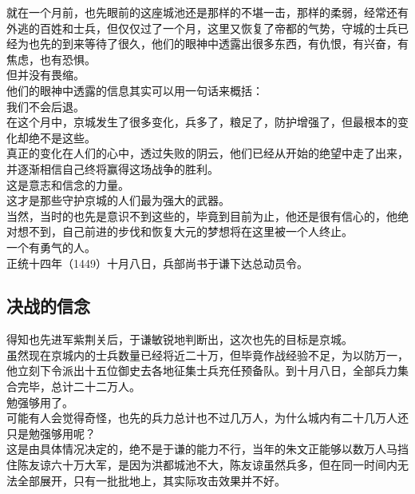 \begin{multicols}{\theparacolNo}
就在一个月前，也先眼前的这座城池还是那样的不堪一击，那样的柔弱，经常还有外逃的百姓和士兵，但仅仅过了一个月，这里又恢复了帝都的气势，守城的士兵已经为也先的到来等待了很久，他们的眼神中透露出很多东西，有仇恨，有兴奋，有焦虑，也有恐惧。\\

但并没有畏缩。\\

他们的眼神中透露的信息其实可以用一句话来概括：\\

我们不会后退。\\

在这个月中，京城发生了很多变化，兵多了，粮足了，防护增强了，但最根本的变化却绝不是这些。\\

真正的变化在人们的心中，透过失败的阴云，他们已经从开始的绝望中走了出来，并逐渐相信自己终将赢得这场战争的胜利。\\

这是意志和信念的力量。\\

这才是那些守护京城的人们最为强大的武器。\\

当然，当时的也先是意识不到这些的，毕竟到目前为止，他还是很有信心的，他绝对想不到，自己前进的步伐和恢复大元的梦想将在这里被一个人终止。\\

一个有勇气的人。\\

正统十四年（1449）十月八日，兵部尚书于谦下达总动员令。\\

\subsection{决战的信念}
得知也先进军紫荆关后，于谦敏锐地判断出，这次也先的目标是京城。\\

虽然现在京城内的士兵数量已经将近二十万，但毕竟作战经验不足，为以防万一，他立刻下令派出十五位御史去各地征集士兵充任预备队。到十月八日，全部兵力集合完毕，总计二十二万人。\\

勉强够用了。\\

可能有人会觉得奇怪，也先的兵力总计也不过几万人，为什么城内有二十几万人还只是勉强够用呢？\\

这是由具体情况决定的，绝不是于谦的能力不行，当年的朱文正能够以数万人马挡住陈友谅六十万大军，是因为洪都城池不大，陈友谅虽然兵多，但在同一时间内无法全部展开，只有一批批地上，其实际攻击效果并不好。\\


\end{multicols}
